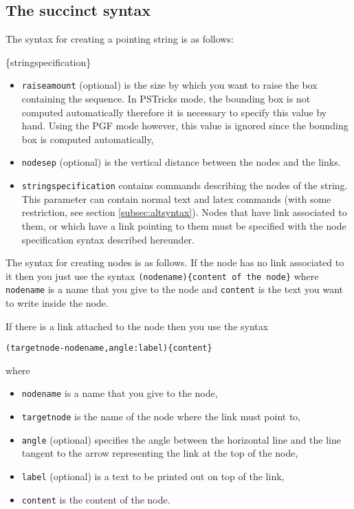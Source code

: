 \subsection{The succinct syntax}
The syntax for creating a pointing string is as follows:
\begin{command}{\Pstr[raiseamount][nodesep]\{stringspecification\}}
\begin{itemize}
\item  \verb|raiseamount| (optional) is the size by which you want
to raise the box containing the sequence. In
PSTricks mode, the bounding box is not computed automatically therefore
it is necessary to specify this value by hand. Using the PGF mode
 however, this value is ignored since the bounding box
is computed automatically,
\item  \verb|nodesep| (optional) is the vertical distance between
the nodes and the links.
\item  \verb|stringspecification| contains commands describing the nodes
of the string.
This parameter can contain normal text and latex commands (with some restriction, see section \ref{subsec:altsyntax}).
Nodes that have link associated to them, or which have a link pointing to them
must be specified with the node specification syntax described hereunder.\end{itemize}
\end{command}

The syntax for creating nodes is as follows.
If the node has no link associated to it then you just use
the syntax \verb|(nodename){content of the node}| where \verb|nodename| is a name that you give to the node and \verb|content| is the text you want to write inside the node.

If there is a link attached to the node then you use
the syntax
\begin{verbatim}
(targetnode-nodename,angle:label){content}
\end{verbatim}
where
\begin{itemize}
\item \verb|nodename| is a name that you give to the node,
\item \verb|targetnode| is the name of the node where the link must point to,
\item \verb|angle| (optional) specifies the angle between the horizontal line and the line
tangent to the arrow representing the link at the top of the node,
\item  \verb|label| (optional) is a text to be printed out on top of the link,
\item \verb|content| is the content of the node.
\end{itemize}

